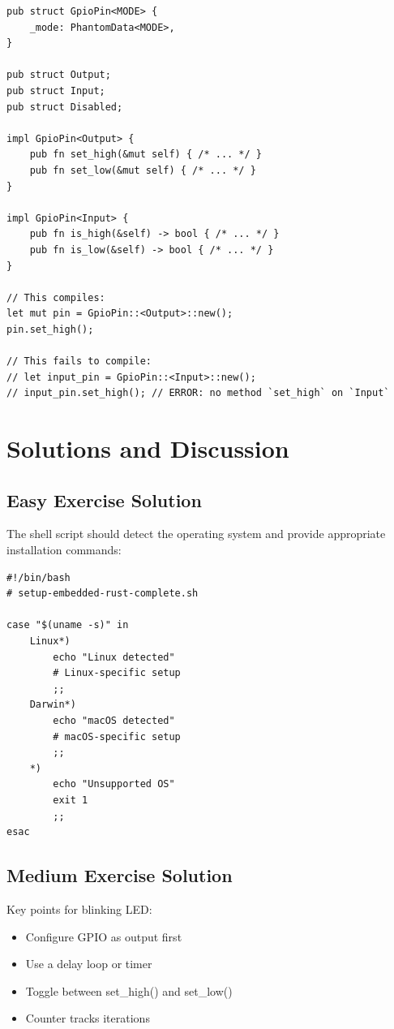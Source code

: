 \begin{verbatim}
pub struct GpioPin<MODE> {
    _mode: PhantomData<MODE>,
}

pub struct Output;
pub struct Input;
pub struct Disabled;

impl GpioPin<Output> {
    pub fn set_high(&mut self) { /* ... */ }
    pub fn set_low(&mut self) { /* ... */ }
}

impl GpioPin<Input> {
    pub fn is_high(&self) -> bool { /* ... */ }
    pub fn is_low(&self) -> bool { /* ... */ }
}

// This compiles:
let mut pin = GpioPin::<Output>::new();
pin.set_high();

// This fails to compile:
// let input_pin = GpioPin::<Input>::new();
// input_pin.set_high(); // ERROR: no method `set_high` on `Input`
\end{verbatim}

\section{Solutions and Discussion}
\label{sec:exercise-solutions}

\subsection{Easy Exercise Solution}
\label{subsec:solution-easy}

The shell script should detect the operating system and provide appropriate installation commands:

\begin{verbatim}
#!/bin/bash
# setup-embedded-rust-complete.sh

case "$(uname -s)" in
    Linux*)
        echo "Linux detected"
        # Linux-specific setup
        ;;
    Darwin*)
        echo "macOS detected"
        # macOS-specific setup
        ;;
    *)
        echo "Unsupported OS"
        exit 1
        ;;
esac
\end{verbatim}

\subsection{Medium Exercise Solution}
\label{subsec:solution-medium}

Key points for blinking LED:

\begin{itemize}
    \item Configure GPIO as output first
    \item Use a delay loop or timer
    \item Toggle between set_high() and set_low()
    \item Counter tracks iterations
\end{itemize}

